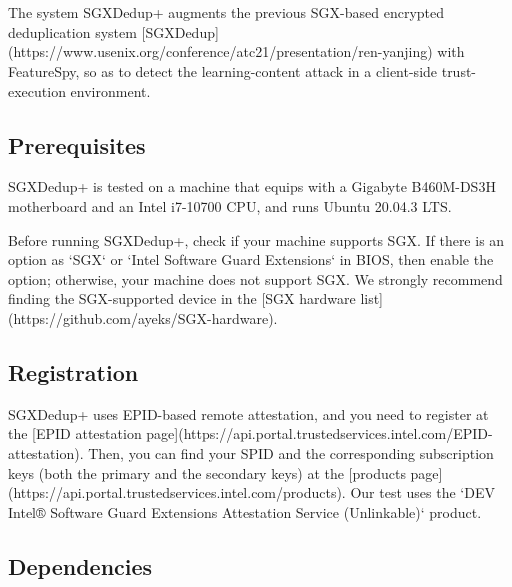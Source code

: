 \section{\prototype}

The system SGXDedup+ augments the previous SGX-based encrypted deduplication system [SGXDedup](https://www.usenix.org/conference/atc21/presentation/ren-yanjing) with FeatureSpy, so as to detect the learning-content attack in a client-side trust-execution environment.


\subsection{Prerequisites}

SGXDedup+ is tested on a machine that equips with a Gigabyte B460M-DS3H motherboard and an Intel i7-10700 CPU, and runs Ubuntu 20.04.3 LTS.

Before running SGXDedup+, check if your machine supports SGX. If there is an option as `SGX` or `Intel Software Guard Extensions` in BIOS, then enable the option; otherwise, your machine does not support SGX. We strongly recommend finding the SGX-supported device in the [SGX hardware list](https://github.com/ayeks/SGX-hardware).

\subsection{Registration}

SGXDedup+ uses EPID-based remote attestation, and you need to register at the [EPID attestation page](https://api.portal.trustedservices.intel.com/EPID-attestation). Then, you can find your SPID and the corresponding subscription keys (both the primary and the secondary keys) at the [products page](https://api.portal.trustedservices.intel.com/products). Our test uses the `DEV Intel® Software Guard Extensions Attestation Service (Unlinkable)` product.


\subsection{Dependencies}

